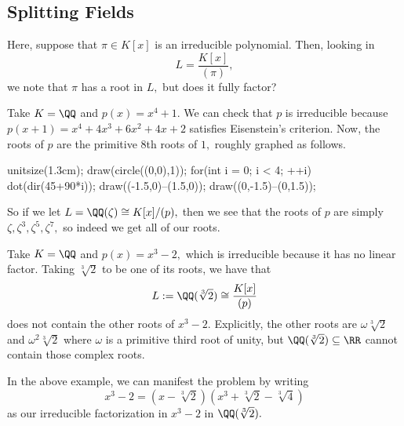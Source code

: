 \subsection{Splitting Fields}
Here, suppose that $\pi\in K[x]$ is an irreducible polynomial. Then, looking in
\[L=\frac{K[x]}{(\pi)},\]
we note that $\pi$ has a root in $L,$ but does it fully factor?
\begin{example}
	Take $K=\QQ$ and $p(x)=x^4+1.$ We can check that $p$ is irreducible because $p(x+1)=x^4+4x^3+6x^2+4x+2$ satisfies Eisenstein's criterion. Now, the roots of $p$ are the primitive $8$th roots of $1,$ roughly graphed as follows.
	\begin{center}
		\begin{asy}
			unitsize(1.3cm);
			draw(circle((0,0),1));
			for(int i = 0; i < 4; ++i)
			{
				dot(dir(45+90*i));
			}
			draw((-1.5,0)--(1.5,0));
			draw((0,-1.5)--(0,1.5));
		\end{asy}
	\end{center}
	So if we let $L=\QQ(\zeta)\cong K[x]/(p),$ then we see that the roots of $p$ are simply $\zeta,\zeta^3,\zeta^5,\zeta^7,$ so indeed we get all of our roots.
\end{example}
\begin{example}
	Take $K=\QQ$ and $p(x)=x^3-2,$ which is irreducible because it has no linear factor. Taking $\sqrt[3]2$ to be one of its roots, we have that
	\[L:=\QQ(\sqrt[3]2)\cong\frac{K[x]}{(p)}\]
	does not contain the other roots of $x^3-2.$ Explicitly, the other roots are $\omega\sqrt[3]2$ and $\omega^2\sqrt[3]2$ where $\omega$ is a primitive third root of unity, but $\QQ(\sqrt[3]2)\subseteq\RR$ cannot contain those complex roots.
\end{example}
In the above example, we can manifest the problem by writing
\[x^3-2=\left(x-\sqrt[3]2\right)\left(x^3+\sqrt[3]2-\sqrt[3]4\right)\]
as our irreducible factorization in $x^3-2$ in $\QQ(\sqrt[3]2).$

